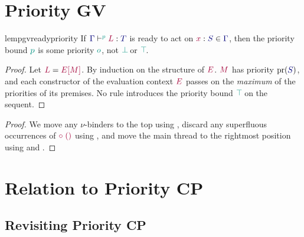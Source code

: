 \section{Priority GV}
\begingroup
{}










\begin{restatablelemma}{lempgvreadypriority}
  \label{lem:pgv-ready-priority}
  If $\tseq[\cs{p}]{\ty{\Gamma}}{L}{T}$ is ready to act on $\tmty{x}{S}\in\ty{\Gamma}$, then the priority bound $\cs{p}$ is some priority $\cs{o}$, \ie not $\cs{\pbot}$ or $\cs{\ptop}$.
\end{restatablelemma}
\begin{proof}
  Let $\tm{L}=\tm{\plug{E}{M}}$. By induction on the structure of $\tm{E}$. $\tm{M}$ has priority $\pr({\ty{S}})$, and each constructor of the evaluation context $\tm{E}$ passes on the \emph{maximum} of the priorities of its premises. No rule introduces the priority bound $\cs{\ptop}$ on the sequent.
\end{proof}

\begin{proof}
  We move any $\nu$-binders to the top using , discard any superfluous occurrences of $\tm{\child\;\unit}$ using , and move the main thread to the rightmost position using  and .
\end{proof}




\endgroup

\section{Relation to Priority CP}
\begingroup
{}
\subsection{Revisiting Priority CP}

